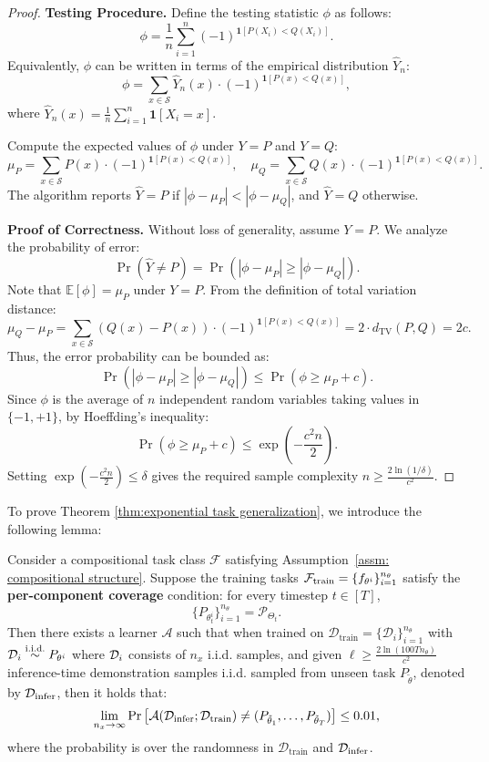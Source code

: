 \begin{proof}
\textbf{Testing Procedure.}  
Define the testing statistic $\phi$ as follows:
\[
\phi = \frac{1}{n} \sum_{i=1}^n (-1)^{\mathbf{1}[P(X_i) < Q(X_i)]}.
\]
Equivalently, $\phi$ can be written in terms of the empirical distribution $\hat{Y}_n$:
\[
\phi = \sum_{x \in \mathcal{S}} \hat{Y}_n(x) \cdot (-1)^{\mathbf{1}[P(x) < Q(x)]},
\]
where $\hat{Y}_n(x) = \frac{1}{n} \sum_{i=1}^n \mathbf{1}[X_i = x]$.

Compute the expected values of $\phi$ under $Y = P$ and $Y = Q$:
\[
\mu_P = \sum_{x \in \mathcal{S}} P(x) \cdot (-1)^{\mathbf{1}[P(x) < Q(x)]}, \quad
\mu_Q = \sum_{x \in \mathcal{S}} Q(x) \cdot (-1)^{\mathbf{1}[P(x) < Q(x)]}.
\]
The algorithm reports $\hat{Y} = P$ if $|\phi - \mu_P| < |\phi - \mu_Q|$, and $\hat{Y} = Q$ otherwise.

\textbf{Proof of Correctness.}  
Without loss of generality, assume $Y = P$. We analyze the probability of error:
\[
\Pr\left( \hat{Y} \neq P \right) = \Pr\left( |\phi - \mu_P| \geq |\phi - \mu_Q| \right).
\]
Note that $\mathbb{E}[\phi] = \mu_P$ under $Y = P$. From the definition of total variation distance:
\[
\mu_Q - \mu_P = \sum_{x \in \mathcal{S}} (Q(x) - P(x)) \cdot (-1)^{\mathbf{1}[P(x) < Q(x)]} = 2 \cdot d_{\mathrm{TV}}(P, Q) = 2c.
\]
Thus, the error probability can be bounded as:
\[
\Pr\left( |\phi - \mu_P| \geq |\phi - \mu_Q| \right) \leq \Pr\left( \phi \geq \mu_P + c \right).
\]
Since $\phi$ is the average of $n$ independent random variables taking values in $\{-1, +1\}$, by Hoeffding's inequality:
\[
\Pr\left( \phi \geq \mu_P + c \right) \leq \exp\left( -\frac{c^2 n}{2} \right).
\]
Setting $\exp\left( -\frac{c^2 n}{2} \right) \leq \delta$ gives the required sample complexity $n \geq \frac{2 \ln(1/\delta)}{c^2}$.
\end{proof}

To prove Theorem \ref{thm:exponential task generalization}, we introduce the following lemma:

\begin{lemma}\label{lem:exponential task generalization}  %
Consider a compositional task class $\mathcal{F}$ satisfying Assumption~\ref{assm: compositional structure}. Suppose the training tasks ${\mathcal{F}}_{\mathrm{train}}= \{f_{\theta^i}\}_{i=1}^{n_\theta}$ satisfy the \textbf{per-component coverage} condition: for every timestep $t \in [T]$,
\[
\{P_{\theta^i_t}\}_{i=1}^{n_\theta} = \mathcal{P}_{\Theta_t}.
\]
Then there exists a learner $\mathcal{A}$ such that when trained on $\mathcal{D}_{\mathrm{train}} = \{\mathcal{D}_i\}_{i=1}^{n_\theta}$ with $\mathcal{D}_i \overset{\text{i.i.d.}}{\sim} P_{\theta^i}$ where ${\mathcal{D}}_i$ consists of $n_x$ i.i.d. samples, and given $\ell \geq \frac{2\ln(100Tn_\theta)}{c^2}$ inference-time demonstration samples i.i.d. sampled from unseen task $P_{\tilde \theta}$, denoted by ${\mathcal{D}}_{\mathrm{infer}}$, 
then it holds that:
\[
\lim_{n_x \to \infty} \Pr\left[ \mathcal{A}(\mathcal{D}_{\mathrm{infer}}; \mathcal{D}_{\mathrm{train}}) \neq (P_{\tilde{\theta}_1}, \dots, P_{\tilde{\theta}_T}) \right] \leq 0.01,
\]
where the probability is over the randomness in $\mathcal{D}_{\mathrm{train}}$ and $\mathcal{D}_{\mathrm{infer}}$.
\end{lemma}

